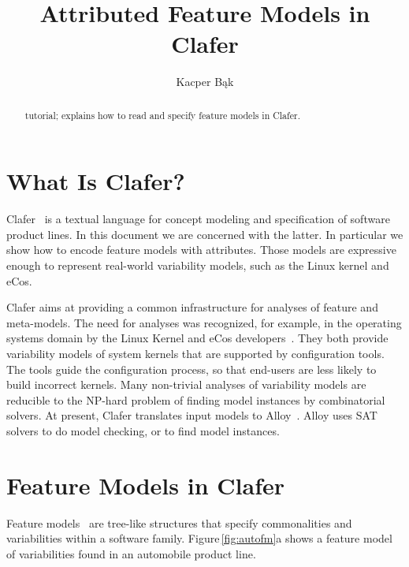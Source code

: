 \documentclass{llncs}
\newcommand{\Figref}[1]{Figure\,\ref{fig:#1}}
\begin{document}
\title{Attributed Feature Models in Clafer}

\author{Kacper B\k{a}k}


\maketitle

\begin{abstract}
tutorial; explains how to read and specify feature models in Clafer.
\end{abstract}

\section{What Is Clafer?}
Clafer~\cite{bak:clafer:2010} is a textual language for concept modeling and specification of software product lines. In this document we are concerned with the latter. In particular we show how to encode feature models with attributes. Those models are expressive enough to represent real-world variability models, such as the Linux kernel and eCos.

Clafer aims at providing a common infrastructure for analyses of feature and meta-models. The need for analyses was recognized, for example, in the operating systems domain by the Linux Kernel and eCos developers~\cite{berger:varmodel:2010}. They both provide variability models of system kernels that are supported by configuration tools. The tools guide the configuration process, so that end-users are less likely to build incorrect kernels. Many non-trivial analyses of variability models are reducible to the NP-hard problem of finding model instances by combinatorial solvers. At present, Clafer translates input models to Alloy~\cite{jackson:alloy:2006}. Alloy uses SAT solvers to do model checking, or to find model instances. 

\section{Feature Models in Clafer}

Feature models~\cite{kang:foda:1990} are tree-like structures that specify commonalities and variabilities within a software family. \Figref{autofm}a shows a feature model of variabilities found in an automobile product line.
\end{document}
